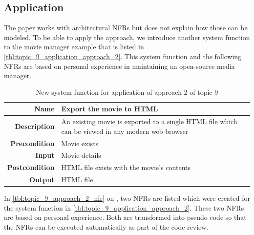 \subsection{Application}

The paper works with architectural NFRs but does not explain how those can be modeled.
To be able to apply the approach, we introduce another system function to the movie manager example that is listed in \autoref{tbl:topic_9_application_approach_2}.
This system function and the following NFRs are based on personal experience in maintaining an open-source media manager.

\begin{table}[h!]
	\centering
	\caption{New system function for application of approach 2 of topic 9}
	\label{tbl:topic_9_application_approach_2}
	\begin{tabular}{r|p{}}
		\hline
		\textbf{Name}          & Export the movie to HTML \\ \hline
		\textbf{Description}   & An existing movie is exported to a single HTML file which can be viewed in any modern web browser \\ \hline
		\textbf{Precondition}  & Movie exists \\ \hline
		\textbf{Input}         & Movie details \\ \hline
		\textbf{Postcondition} & HTML file exists with the movie's contents \\ \hline
		\textbf{Output}        & HTML file \\ \hline
	\end{tabular}
\end{table}

In \autoref{tbl:topic_9_approach_2_nfr} on , two NFRs are listed which were created for the system function in \autoref{tbl:topic_9_application_approach_2}. 
These two NFRs are based on personal experience.
Both are transformed into pseudo code so that the NFRs can be executed automatically as part of the code review.

